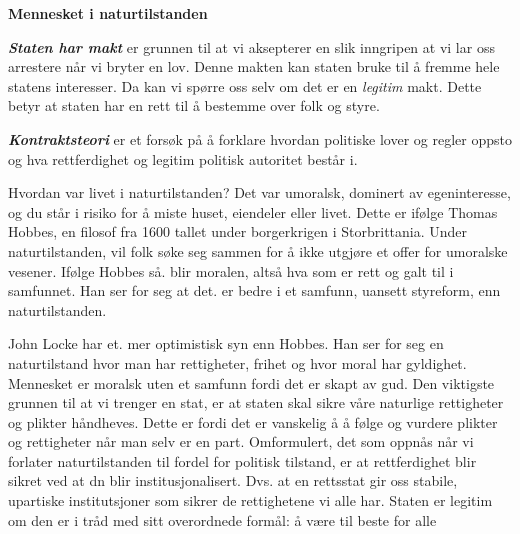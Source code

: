 \documentclass[11pt, a4paper]{article}
\newenvironment{sectionbox}[1][]{%
    \begin{sectionboxinner}
    \textbf{\large #1}
    \vspace{1pt}
    \newline
}{%
    \end{sectionboxinner}
}
\begin{document}
\begin{sectionbox}[Mennesket i naturtilstanden]

\begin{flushleft}
    \textbf{\textit{Staten har makt}} er grunnen til at vi aksepterer en slik inngripen at vi lar oss arrestere når vi bryter en lov. Denne makten kan staten bruke til å fremme hele statens interesser. Da kan vi spørre oss selv om det er en \textit{legitim} makt. Dette betyr at staten har en rett til å bestemme over folk og styre.\\
    
\end{flushleft}

\begin{flushleft}
    \textbf{\textit{Kontraktsteori}} er et forsøk på å forklare hvordan politiske lover og regler oppsto og hva rettferdighet og legitim politisk autoritet består i. 
\end{flushleft}

\begin{flushleft}
    Hvordan var livet i naturtilstanden? Det var umoralsk, dominert av egeninteresse, og du står i risiko for å miste huset, eiendeler eller livet. Dette er ifølge Thomas Hobbes, en filosof fra 1600 tallet under borgerkrigen i Storbrittania. Under naturtilstanden, vil folk søke seg sammen for å ikke utgjøre et offer for umoralske vesener. Ifølge Hobbes så. blir moralen, altså hva som er rett og galt til i samfunnet. Han ser for seg at det. er bedre i et samfunn, uansett styreform, enn naturtilstanden.
\end{flushleft}


\begin{flushleft}
    John Locke har et. mer optimistisk syn enn Hobbes.  Han ser for seg en naturtilstand hvor man har rettigheter, frihet og hvor moral har gyldighet. Mennesket er moralsk uten et samfunn fordi det er skapt av gud. Den viktigste grunnen til at vi trenger en stat, er at staten skal sikre våre naturlige rettigheter og plikter håndheves. Dette er fordi det er vanskelig å å følge og vurdere plikter og rettigheter når man selv er en part. Omformulert, det som oppnås når vi forlater naturtilstanden til fordel for politisk tilstand, er at rettferdighet blir sikret ved at dn blir institusjonalisert. Dvs. at en rettsstat gir oss stabile, upartiske institutsjoner som sikrer de rettighetene vi alle har. Staten er legitim om den er i tråd med sitt overordnede formål: å være til beste for alle
\end{flushleft}

\end{sectionbox}
\end{document}
